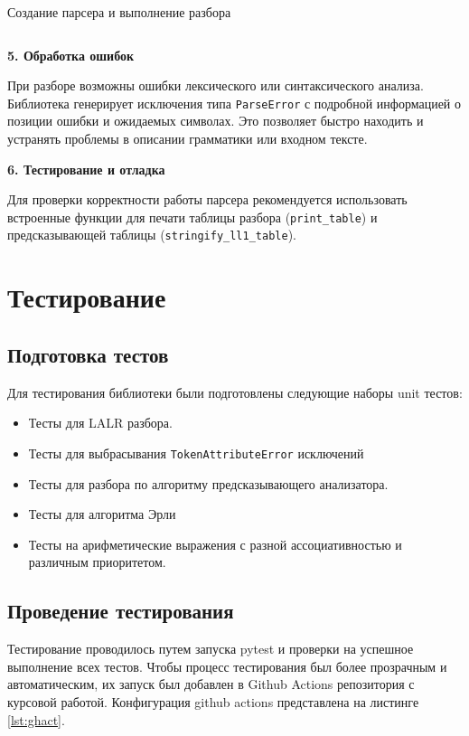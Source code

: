 \documentclass[14pt, russian]{scrartcl}
\begin{document}
\begin{listing}[H]
	\caption{Создание парсера и выполнение разбора}
	\label{lst:guide4}
	\inputminted[style=bw, frame=single,fontsize = \footnotesize, linenos=false, xleftmargin = 1.5em]{python}{./listings/guide/4.py}
\end{listing}

\textbf{5. Обработка ошибок}

При разборе возможны ошибки лексического или синтаксического анализа. Библиотека генерирует
исключения типа \texttt{ParseError} с подробной информацией о позиции ошибки и ожидаемых символах.
Это позволяет быстро находить и устранять проблемы в описании грамматики или входном тексте.

\textbf{6. Тестирование и отладка}

Для проверки корректности работы парсера рекомендуется использовать встроенные функции для печати таблицы разбора
(\texttt{print\_table}) и предсказывающей таблицы (\texttt{stringify\_ll1\_table}).

\section{Тестирование}

\subsection{Подготовка тестов}

Для тестирования библиотеки были подготовлены следующие наборы unit тестов:

\begin{itemize}
	\item Тесты для LALR разбора.
	\item Тесты для выбрасывания \texttt{TokenAttributeError} исключений
	\item Тесты для разбора по алгоритму предсказывающего анализатора.
	\item Тесты для алгоритма Эрли
	\item Тесты на арифметические выражения с разной ассоциативностью и различным приоритетом.
\end{itemize}

\subsection{Проведение тестирования}

Тестирование проводилось путем запуска pytest и проверки на успешное выполнение всех тестов.
Чтобы процесс тестирования был более прозрачным и автоматическим, их запуск был добавлен в Github Actions репозитория
с курсовой работой. Конфигурация github actions представлена на листинге \ref{lst:ghact}.
\end{document}
